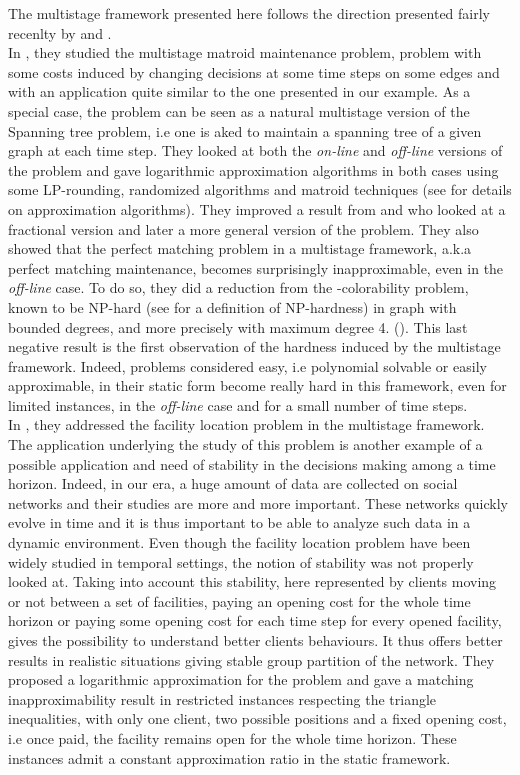 \documentclass[a4paper]{book}
\begin{document}
The multistage framework presented here follows the direction presented fairly recenlty by \cite{Gupta} and \cite{Eisenstat}.\\
In \cite{Gupta}, they studied the {\sc multistage matroid maintenance} problem, problem with some costs induced by changing decisions at some time steps on some edges and with an application quite similar to the one presented in our example. As a special case, the problem can be seen as a natural multistage version of the {\sc Spanning tree} problem, i.e one is aked to maintain a {\sc spanning tree} of a given graph at each time step.  They looked at both the \emph{on-line} and \emph{off-line} versions of the problem and gave logarithmic approximation algorithms in both cases using some LP-rounding, randomized algorithms and matroid techniques (see \cite{vazirani2013approximation} for details on approximation algorithms). They improved a result from \cite{buchbinder2012unified} and \cite{buchbinder2014competitive} who looked at a fractional version and later a more general version of the problem. They also showed that the {\sc perfect matching} problem in a multistage framework, a.k.a {\sc perfect matching maintenance}, becomes surprisingly inapproximable, even in the \emph{off-line} case. To do so, they did a reduction from the {-colorability} problem, known to be NP-hard (see \cite{gj} for a definition of NP-hardness) in graph with bounded degrees, and more precisely with maximum degree 4. (\cite{guruswami2004hardness}). This last negative result is the first observation of the hardness induced by the multistage framework. Indeed, problems considered easy, i.e polynomial solvable or easily approximable, in their static form become really hard in this framework, even for limited instances, in the \emph{off-line} case and for a small number of time steps.\\
In \cite{Eisenstat}, they addressed the {\sc facility location }problem in the multistage framework. The application underlying the study of this problem is another example of a possible application and need of stability in the decisions making among a time horizon. Indeed, in our era, a huge amount of data are collected on social networks and their studies are more and more important. These networks quickly evolve in time and it is thus important to be able to analyze such data in a dynamic environment. Even though the {\sc facility location} problem have been widely studied in temporal settings, the notion of stability was not properly looked at. Taking into account this stability, here represented by clients moving or not between a set of facilities, paying an opening cost for the whole time horizon or paying some opening cost for each time step for every opened facility, gives the possibility to understand better clients behaviours. It thus offers better results in realistic situations giving stable group partition of the network. They proposed a logarithmic approximation for the problem and gave a matching inapproximability result in restricted instances respecting the triangle inequalities, with only one client, two possible positions and a fixed opening cost, i.e once paid, the facility remains open for the whole time horizon. These instances admit a constant approximation ratio in the static framework. \\
\end{document}
